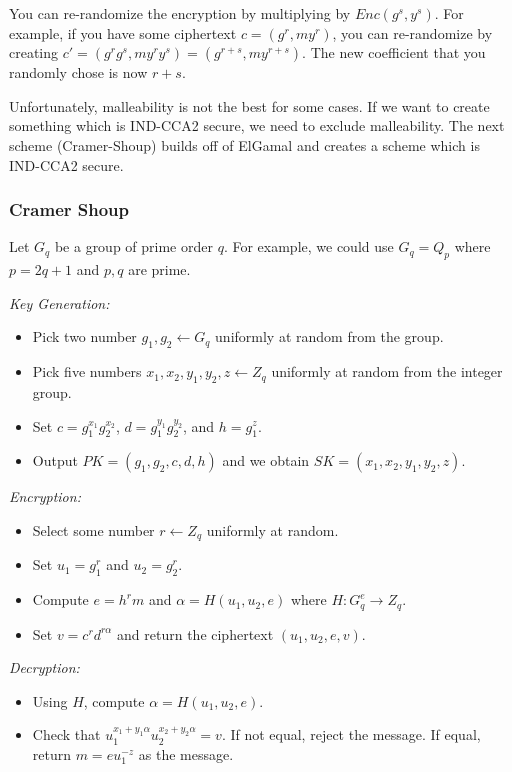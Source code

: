 \documentclass[psamsfonts]{amsart}
\begin{document}
You can re-randomize the encryption by multiplying by $Enc(g^s, y^s)$. For example, if you have some ciphertext $c = (g^r, m y^r)$, you can re-randomize by creating $c' = (g^r g^s, m y^r y^s) = (g^{r+s}, m y^{r+s})$. The new coefficient that you randomly chose is now $r+s$.

Unfortunately, malleability is not the best for some cases. If we want to create something which is IND-CCA2 secure, we need to exclude malleability. The next scheme (Cramer-Shoup) builds off of ElGamal and creates a scheme which is IND-CCA2 secure.

\subsubsection{Cramer Shoup}

Let $G_q$ be a group of prime order $q$. For example, we could use $G_q = Q_p$ where $p = 2q+1$ and $p,q$ are prime.

\emph{Key Generation:}
\begin{itemize}
  \item Pick two number $g_1, g_2 \leftarrow G_q$ uniformly at random from the group.
  \item Pick five numbers $x_1, x_2, y_1, y_2, z \leftarrow Z_q$ uniformly at random from the integer group.
  \item Set $c = g_1^{x_1} g_2^{x_2}$, $d = g_1^{y_1} g_2^{y_2}$, and $h = g_1^z$.
  \item Output $PK = (g_1, g_2, c, d, h)$ and we obtain $SK = (x_1, x_2, y_1, y_2, z)$.
\end{itemize}

\emph{Encryption:}
\begin{itemize}
  \item Select some number $r \leftarrow Z_q$ uniformly at random.
  \item Set $u_1 = g_1^{r}$ and $u_2 = g_2^{r}$.
  \item Compute $e = h^r m$ and $\alpha = H(u_1, u_2, e)$ where $H: G_q^{e} \to Z_q$.
  \item Set $v = c^r d^{r \alpha}$ and return the ciphertext $(u_1, u_2, e, v)$.
\end{itemize}

\emph{Decryption:}
\begin{itemize}
  \item Using $H$, compute $\alpha = H(u_1, u_2, e)$.
  \item Check that $u_1^{x_1 + y_1 \alpha} u_2^{x_2 + y_2 \alpha} = v$. If not equal, reject the message. If equal, return $m = e u_1^{-z}$ as the message.
\end{itemize}
\end{document}
